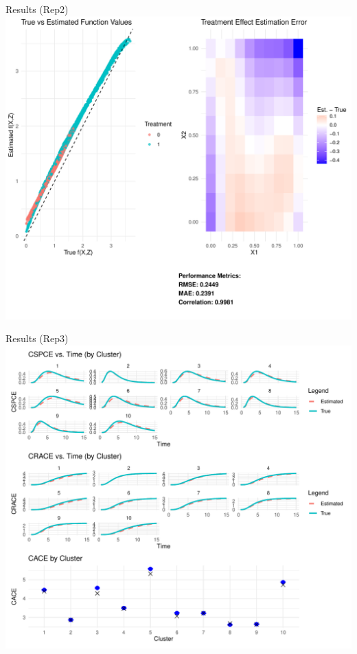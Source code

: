 \begin{frame}{Results (Rep2)}
  \includegraphics[height=.8\linewidth]{pics/Sim4_rep2_2.pdf}
\end{frame}

\begin{frame}{Results (Rep3)}
  \includegraphics[height=.8\linewidth]{pics/Sim4_rep3.pdf}
\end{frame}


